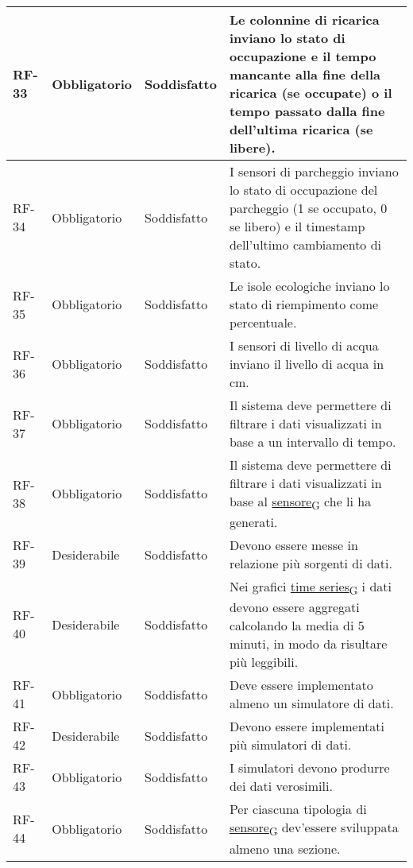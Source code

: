 \begin{longtable}{|>{\centering\arraybackslash}m{}|>{\centering\arraybackslash}m{}|>{\centering\arraybackslash}m{}|>{\centering\arraybackslash}m{}|}
	RF-33           & Obbligatorio        & Soddisfatto & Le colonnine di ricarica inviano lo stato di occupazione e il tempo mancante alla fine della ricarica (se occupate) o il tempo passato dalla fine dell'ultima ricarica (se libere).
	\\\hline
	RF-34           & Obbligatorio        & Soddisfatto & I sensori di parcheggio inviano lo stato di occupazione del parcheggio (1 se occupato, 0 se libero) e il timestamp dell'ultimo cambiamento di stato.
	\\\hline
	RF-35           & Obbligatorio        & Soddisfatto & Le isole ecologiche inviano lo stato di riempimento come percentuale.
	\\\hline
	RF-36           & Obbligatorio        & Soddisfatto & I sensori di livello di acqua inviano il livello di acqua in cm.
	\\\hline
	RF-37           & Obbligatorio        & Soddisfatto & Il sistema deve permettere di filtrare i dati visualizzati in base a un intervallo di tempo.
	\\\hline
	RF-38           & Obbligatorio        & Soddisfatto & Il sistema deve permettere di filtrare i dati visualizzati in base al \href{https://7last.github.io/docs/pb/documentazione-interna/glossario\#sensore}{sensore\textsubscript{G}} che li ha generati.
	\\\hline
	RF-39           & Desiderabile        & Soddisfatto & Devono essere messe in relazione più sorgenti di dati.
	\\\hline
	RF-40           & Desiderabile        & Soddisfatto & Nei grafici \href{https://7last.github.io/docs/pb/documentazione-interna/glossario\#time-series}{time series\textsubscript{G}} i dati devono essere aggregati calcolando la media di 5 minuti, in modo da risultare più leggibili.
	\\\hline
	RF-41           & Obbligatorio        & Soddisfatto & Deve essere implementato almeno un simulatore di dati.
	\\\hline
	RF-42           & Desiderabile        & Soddisfatto & Devono essere implementati più simulatori di dati.
	\\\hline
	RF-43           & Obbligatorio        & Soddisfatto & I simulatori devono produrre dei dati verosimili.
	\\\hline
	RF-44           & Obbligatorio        & Soddisfatto & Per ciascuna tipologia di \href{https://7last.github.io/docs/pb/documentazione-interna/glossario\#sensore}{sensore\textsubscript{G}} dev'essere sviluppata almeno una sezione.
	\\\hline

\end{longtable}
